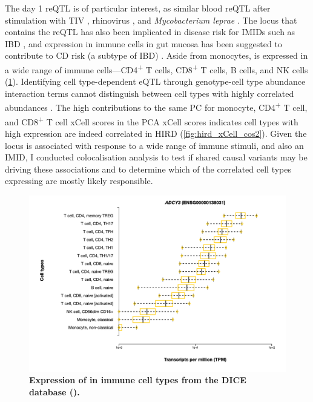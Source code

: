 The day 1  \gls{reQTL} is of particular interest,
as similar blood \gls{reQTL} after stimulation with \gls{TIV} \autocite{franco2013IntegrativeGenomicAnalysis}, rhinovirus \autocite{caliskan2015HostGeneticVariation}, and \textit{Mycobacterium leprae} \autocite{manry2017DecipheringGeneticControl}.
The locus that contains the  \gls{reQTL} has also been implicated in disease risk for \glspl{IMID} such as \gls{IBD} \autocite{delange2017GenomewideAssociationStudy},
and  expression in immune cells in gut mucosa has been suggested to contribute to \gls{CD} risk (a subtype of \gls{IBD}) \autocite{marigorta2017TranscriptionalRiskScores}.
Aside from monocytes,  is expressed in a wide range of immune cells---CD4\textsuperscript{+} T cells, CD8\textsuperscript{+} T cells, B cells, and \gls{NK} cells (\cref{fig:hird_eQTL_ADCY3_expression_DICE}).
Identifying cell type-dependent \gls{eQTL} through genotype-cell type abundance interaction terms cannot distinguish between cell types with highly correlated abundances \autocite{kim-hellmuth2020CellTypeSpecific}.
The high contributions to the same \gls{PC} for monocyte, CD4\textsuperscript{+} T cell, and CD8\textsuperscript{+} T cell xCell scores in the \gls{PCA} xCell scores indicates cell types with high  expression are indeed correlated in \gls{HIRD} (\cref{fig:hird_xCell_cos2}).
Given the locus is associated with response to a wide range of immune stimuli, and also an \gls{IMID},
I conducted colocalisation analysis to test if shared causal variants 
may be driving these associations and to determine which of the correlated cell types expressing  are mostly likely responsible.

\begin{figure}
    \centering
    \includegraphics[width=1.0\textwidth,page=1]{mainmatter/figures/chapter_03/ADCY3_expression.png}
    \caption{
        \textbf{Expression of  in immune cell types from the DICE database (\textcite{schmiedel2018ImpactGeneticPolymorphisms}).}
    }
    \label{fig:hird_eQTL_ADCY3_expression_DICE}
\end{figure}

